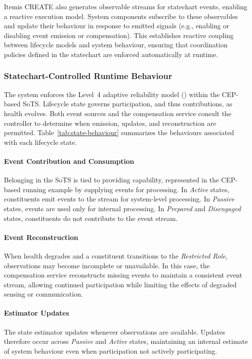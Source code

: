 Itemis CREATE also generates observable streams for statechart events, enabling a reactive execution model. System components subscribe to these observables and update their behaviour in response to emitted signals (e.g., enabling or disabling event emission or compensation). This establishes reactive coupling between lifecycle models and system behaviour, ensuring that coordination policies defined in the statechart are enforced automatically at runtime.

\subsubsection{Statechart-Controlled Runtime Behaviour}
The system enforces the Level~4 adaptive reliability model () within the CEP-based SoTS. Lifecycle state governs participation, and thus contributions, as health evolves. Both event sources and the compensation service consult the controller to determine when emission, updates, and reconstruction are permitted. Table~\ref{tab:state-behaviour} summarizes the behaviours associated with each lifecycle state.



\paragraph{Event Contribution and Consumption}
Belonging in the SoTS is tied to providing capability, represented in the CEP-based running example by supplying events for processing. In \textit{Active} states, constituents emit events to the stream for system-level processing. In \textit{Passive} states, events are used only for internal processing. In \textit{Prepared} and \textit{Disengaged} states, constituents do not contribute to the event stream.

\paragraph{Event Reconstruction}
When health degrades and a constituent transitions to the \textit{Restricted Role}, observations may become incomplete or unavailable. In this case, the compensation service reconstructs missing events to maintain a consistent event stream, allowing continued participation while limiting the effects of degraded sensing or communication.

\paragraph{Estimator Updates}
The state estimator updates whenever observations are available. Updates therefore occur across \textit{Passive} and \textit{Active} states, maintaining an internal estimate of system behaviour even when participation not actively participating.


